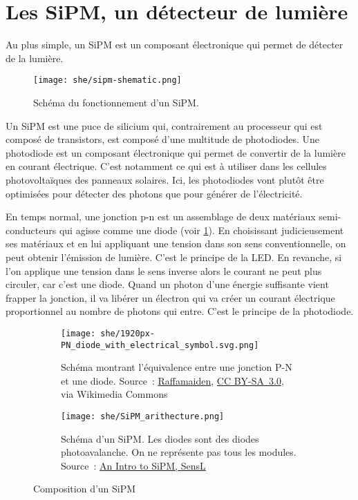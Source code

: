 \section{Les SiPM, un détecteur de lumière}
Au plus simple, un SiPM est un composant électronique qui permet de détecter de la lumière.
\begin{wrapfigure}{r}{0.4\textwidth}
    \centering
    \texttt{[image: she/sipm-shematic.png]}
    \caption{Schéma du fonctionnement d'un SiPM.}
\end{wrapfigure}




Un SiPM est une puce de silicium qui, contrairement au processeur qui est composé de transistors, est composé d'une multitude de photodiodes. Une photodiode est un composant électronique qui permet de convertir de la lumière en courant électrique. C'est notamment ce qui est à utiliser dans les cellules photovoltaïques des panneaux solaires. Ici, les photodiodes vont plutôt être optimisées pour détecter des photons que pour générer de l'électricité.

En temps normal, une jonction p-n est un assemblage de deux matériaux semi-conducteurs qui agisse comme une diode (voir \cref{fig_pn_diode}). En choisissant judicieusement ses matériaux et en lui appliquant une tension dans son sens conventionnelle, on peut obtenir l'émission de lumière. C'est le principe de la LED. En revanche, si l’on applique une tension dans le sens inverse alors le courant ne peut plus circuler, car c'est une diode. Quand un photon d'une énergie suffisante vient frapper la jonction, il va libérer un électron qui va créer un courant électrique proportionnel au nombre de photons qui entre. C'est le principe de la photodiode.

\begin{figure}[h!t]
    \centering
    \begin{subfigure}[c]{0.45\textwidth}
        \centering
        \texttt{[image: she/1920px-PN\_diode\_with\_electrical\_symbol.svg.png]}

        \caption{Schéma montrant l'équivalence entre une jonction P-N et une diode. Source~: \href{https://commons.wikimedia.org/wiki/File:PN_diode_with_electrical_symbol.svg}{Raffamaiden}, \href{https://creativecommons.org/licenses/by-sa/3.0}{CC BY-SA~3.0}, via Wikimedia Commons}
        \label{fig_pn_diode}
    \end{subfigure}
    \begin{subfigure}[c]{0.45\textwidth}
        \centering
        \texttt{[image: she/SiPM\_arithecture.png]}

        \caption{Schéma d'un SiPM. Les diodes sont des diodes photoavalanche. On ne représente pas tous les modules. Source~: \href{https://websites.umich.edu/~ners580/ners-bioe_481/lectures/pdfs/2017-02-.pdf}{An Intro to SiPM, SensL}}
        \label{fig_SiPM}
    \end{subfigure}
    \caption[Composition d'un SiPM]{Composition d'un SiPM}

\end{figure}

